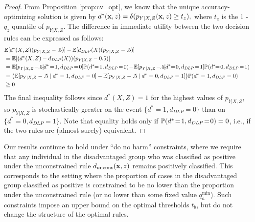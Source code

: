 \begin{proof}
 From Proposition \ref{prop:cv_opt},
 we know that the unique accuracy-optimizing solution is given by 
 $d^*(\vct x,z) = \delta(p_{Y|X, Z}(\vct x,z) \ge t_{z}),$
 where $t_{z}$ is the 1 - $q_{z}$ quantile of $p_{Y|X, Z}$.  
 The difference in immediate utility 
 between the two decision rules 
 can be expressed as follows:
 \small
 \begin{align*}
 	&\E[d^*(X, Z)(p_{Y|X, Z} - .5)] - \E[d_{\mathit{DLP}}(X)(p_{Y|X, Z} - .5)] \\
     &= \E[(d^*(X, Z) - d_{\mathit{DLP}}(X))(p_{Y|X, Z} - 0.5)] \\
     &= \E[p_{Y|X, Z}\!-\! \!.5\!\! \mid\!\! d^*\! =\! 1, d_{\mathit{DLP}}\! =\! 0]\P(d^*\!\! =\! 1, d_{\mathit{DLP}}\! =\! 0)
     \!-\!\E[p_{Y|X, Z}\! -\!\! .5\! \!\mid\!\! d^*\!\! =\! 0, d_{\mathit{DLP}}\! =\! 1]\P(d^*\!\! =\! 0, d_{\mathit{DLP}}\! =\! 1) \\
     &= \bigl( \E[p_{Y|X, Z} - .5 \mid d^* = 1, d_{\mathit{DLP}} = 0]  - \E[p_{Y|X, Z} - .5 \mid d^* = 0, d_{\mathit{DLP}} = 1] \bigr) \P(d^* = 1, d_{\mathit{DLP}} = 0) \\
     &\ge 0
 \end{align*}
 \normalsize
 The final inequality follows 
 since
 $d^*(X, Z) = 1$ for the highest values of $p_{Y|X, Z}$, 
 so $p_{Y|X,Z}$ is stochastically greater 
 on the event $\{d^*\!=\! 1, d_{\mathit{DLP}}\! =\! 0\}$ 
 than on $\{d^*\! =\! 0, d_{\mathit{DLP}}\! =\! 1\}$.  
 Note that equality holds only if 
 $\P(d^*\! =\! 1, d_{\mathit{DLP}}\! =\! 0) = 0$, i.e., 
 if the two rules are (almost surely) equivalent.
\end{proof}

Our results
continue to hold 
under ``do no harm'' constraints, where we require that any individual in the disadvantaged group who was classified as positive under 
the unconstrained rule $d_\mathrm{uncons}(\vct x,z)$ remains positively classified.  This corresponds to the setting where 
the proportion of cases 
in the disadvantaged group classified as positive 
is constrained to be no lower 
than the proportion under the unconstrained rule 
(or no lower than some fixed value $q_a^\mathrm{min}$).  
Such constraints impose an upper bound on the optimal thresholds $t_b$, but do not change the structure of the optimal rules. 


